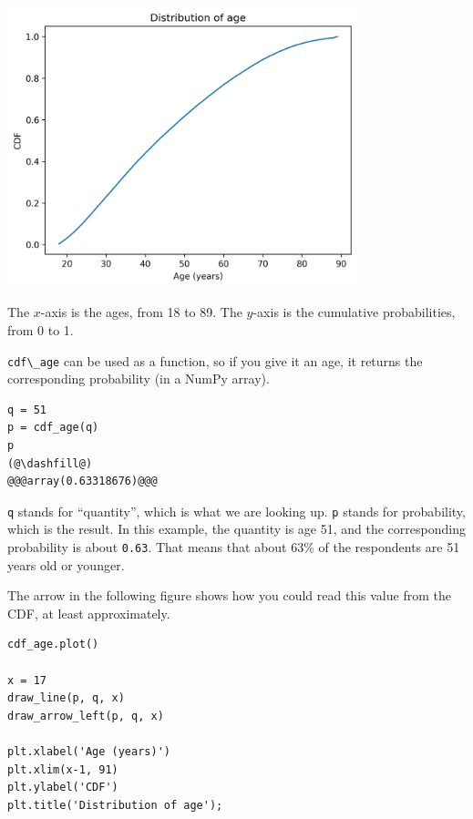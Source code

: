 \begin{center}
\includegraphics[width=4in]{chapters/08_distributions_files/08_distributions_66_0.png}
\end{center}

The \(x\)-axis is the ages, from 18 to 89. The \(y\)-axis is the
cumulative probabilities, from 0 to 1.

\passthrough{\lstinline!cdf\_age!} can be used as a function, so if you
give it an age, it returns the corresponding probability (in a NumPy
array).

\begin{lstlisting}[]
q = 51
p = cdf_age(q)
p
(@\dashfill@)
@@@array(0.63318676)@@@
\end{lstlisting}

\passthrough{\lstinline!q!} stands for ``quantity'', which is what we
are looking up. \passthrough{\lstinline!p!} stands for probability,
which is the result. In this example, the quantity is age 51, and the
corresponding probability is about \passthrough{\lstinline!0.63!}. That
means that about 63\% of the respondents are 51 years old or younger.

The arrow in the following figure shows how you could read this value
from the CDF, at least approximately.

\begin{lstlisting}[]
cdf_age.plot()

x = 17
draw_line(p, q, x)
draw_arrow_left(p, q, x)

plt.xlabel('Age (years)')
plt.xlim(x-1, 91)
plt.ylabel('CDF')
plt.title('Distribution of age');
\end{lstlisting}

